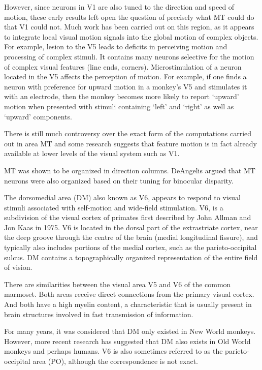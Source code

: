 \documentclass[]{book}
\begin{document}
However, since neurons in V1 are also tuned to the direction and speed of motion, these early results left open the question of precisely what MT could do that V1 could not. Much work has been carried out on this region, as it appears to integrate local visual motion signals into the global motion of complex objects. For example, lesion to the V5 leads to deficits in perceiving motion and processing of complex stimuli. It contains many neurons selective for the motion of complex visual features (line ends, corners). Microstimulation of a neuron located in the V5 affects the perception of motion. For example, if one finds a neuron with preference for upward motion in a monkey's V5 and stimulates it with an electrode, then the monkey becomes more likely to report `upward' motion when presented with stimuli containing `left' and `right' as well as `upward' components.

There is still much controversy over the exact form of the computations carried out in area MT and some research suggests that feature motion is in fact already available at lower levels of the visual system such as V1.

MT was shown to be organized in direction columns. DeAngelis argued that MT neurons were also organized based on their tuning for binocular disparity.

The dorsomedial area (DM) also known as V6, appears to respond to visual stimuli associated with self-motion and wide-field stimulation. V6, is a subdivision of the visual cortex of primates first described by John Allman and Jon Kaas in 1975. V6 is located in the dorsal part of the extrastriate cortex, near the deep groove through the centre of the brain (medial longitudinal fissure), and typically also includes portions of the medial cortex, such as the parieto-occipital sulcus. DM contains a topographically organized representation of the entire field of vision.

There are similarities between the visual area V5 and V6 of the common marmoset. Both areas receive direct connections from the primary visual cortex. And both have a high myelin content, a characteristic that is usually present in brain structures involved in fast transmission of information.

For many years, it was considered that DM only existed in New World monkeys. However, more recent research has suggested that DM also exists in Old World monkeys and perhaps humans. V6 is also sometimes referred to as the parieto-occipital area (PO), although the correspondence is not exact.
\end{document}
